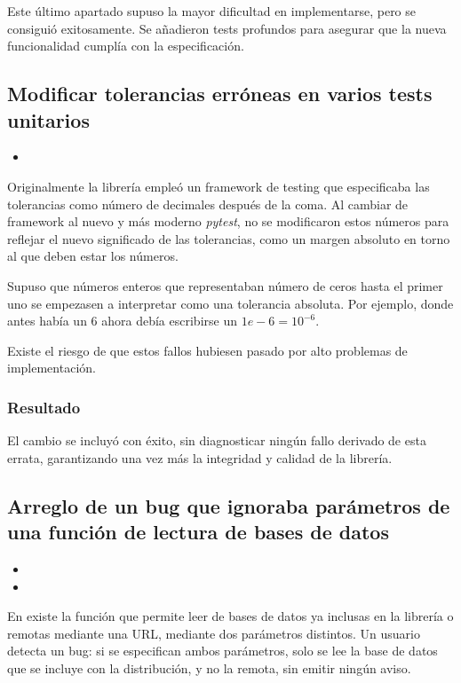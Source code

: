 Este último apartado supuso la mayor dificultad en implementarse, pero se consiguió exitosamente. Se añadieron tests profundos para asegurar que la nueva funcionalidad cumplía con la especificación.

\subsection{Modificar tolerancias erróneas en varios tests unitarios}

\begin{itemize}
    \item {}
\end{itemize}

Originalmente la librería empleó un \gls{framework} de testing que especificaba las tolerancias como número de decimales después de la coma. Al cambiar de framework al nuevo y más moderno \textit{pytest}, no se modificaron estos números para reflejar el nuevo significado de las tolerancias, como un margen absoluto en torno al que deben estar los números.

Supuso que números enteros que representaban número de ceros hasta el primer uno se empezasen a interpretar como una tolerancia absoluta. Por ejemplo, donde antes había un $6$ ahora debía escribirse un $1e-6 = 10^{-6}$.

Existe el riesgo de que estos fallos hubiesen pasado por alto problemas de implementación.

\subsubsection{Resultado}

El cambio se incluyó con éxito, sin diagnosticar ningún fallo derivado de esta errata, garantizando una vez más la integridad y calidad de la librería.

\subsection{Arreglo de un bug que ignoraba parámetros de una función de lectura de bases de datos}

\begin{itemize}
    \item {}
    \item {}
\end{itemize}

En \pvlibpy{} existe la función  que permite leer de bases de datos ya inclusas en la librería o remotas mediante una URL, mediante dos parámetros distintos. Un usuario detecta un \gls{bug}: si se especifican ambos parámetros, solo se lee la base de datos que se incluye con la distribución, y no la remota, sin emitir ningún aviso.

